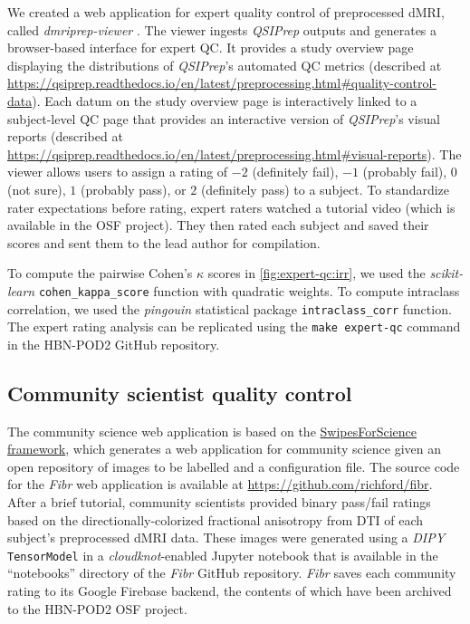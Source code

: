 \documentclass[fleqn,10pt]{wlscirep}
\begin{document}
We created a web application for expert quality control of preprocessed dMRI,
called \emph{dmriprep-viewer} \cite{richie-halford2021-viewer}. The viewer
ingests \emph{QSIPrep} outputs and generates a browser-based interface for
expert QC. It provides a study overview page displaying the distributions of
\emph{QSIPrep}'s automated QC metrics (described at
\url{https://qsiprep.readthedocs.io/en/latest/preprocessing.html#quality-control-data}).
Each datum on the study overview page is interactively linked to a subject-level
QC page that provides an interactive version of \emph{QSIPrep}'s visual reports
(described at
\url{https://qsiprep.readthedocs.io/en/latest/preprocessing.html#visual-reports}).
The viewer allows users to assign a rating of $-2$ (definitely fail), $-1$
(probably fail), $0$ (not sure), $1$ (probably pass), or $2$ (definitely pass) to a
subject. To standardize rater expectations before rating, expert raters watched
a tutorial video (which is available in the OSF project). They then rated each
subject and saved their scores and sent them to the lead author for compilation.


To compute the pairwise Cohen's $\kappa$ scores in \ref{fig:expert-qc:irr}, we
used the \emph{scikit-learn} \cite{scikit-learn} \texttt{cohen\_kappa\_score}
function with quadratic weights. To compute intraclass correlation, we used the
\emph{pingouin} statistical package \cite{vallat2018pingouin}
\texttt{intraclass\_corr} function. The expert rating analysis can be replicated
using the \texttt{make expert-qc} command in the HBN-POD2 GitHub repository.

\subsection*{Community scientist quality control}

The community science web application is based on the
\href{https://swipesforscience.org/}{SwipesForScience framework}, which
generates a web application for community science given an open repository of
images to be labelled and a configuration file. The source code for the
\emph{Fibr} web application is available at
\url{https://github.com/richford/fibr}.
After a brief tutorial, community scientists provided binary pass/fail ratings
based on the directionally-colorized fractional anisotropy from DTI of each
subject's preprocessed dMRI data. These images were generated using a \emph{DIPY}
\cite{dipy} \texttt{TensorModel} in a \emph{cloudknot}-enabled Jupyter notebook
that is available in the ``notebooks'' directory of the \emph{Fibr} GitHub
repository. \emph{Fibr} saves each community rating to its Google Firebase
backend, the contents of which have been archived to the HBN-POD2 OSF project.
\end{document}
